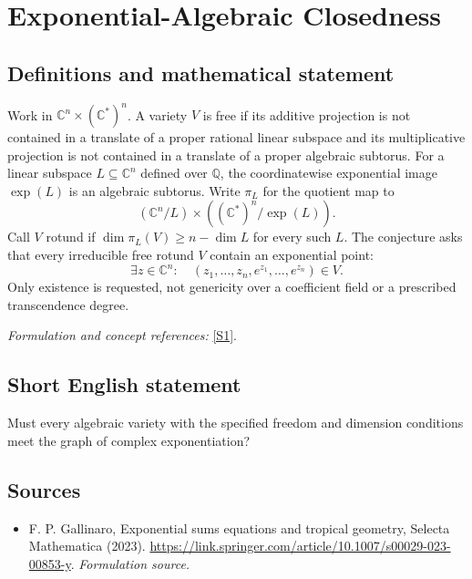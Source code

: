 \documentclass[11pt]{article}
\begin{document}
\section*{\texorpdfstring{Exponential-Algebraic Closedness}{Exponential-Algebraic Closedness}}\label{statement}
\subsection{Definitions and mathematical statement}
Work in ${\mathbb{C}}^n\times({\mathbb{C}}^*)^n$. A variety $V$ is free if its additive projection is not contained in a translate of a proper rational linear subspace and its multiplicative projection is not contained in a translate of a proper algebraic subtorus. For a linear subspace $L\subseteq{\mathbb{C}}^n$ defined over ${\mathbb{Q}}$, the coordinatewise exponential image $\exp(L)$ is an algebraic subtorus. Write $\pi_L$ for the quotient map to
\[
 ({\mathbb{C}}^n/L)\times(({\mathbb{C}}^*)^n/\exp(L)).
\]
Call $V$ rotund if $\dim\pi_L(V)\ge n-\dim L$ for every such $L$. The conjecture asks that every irreducible free rotund $V$ contain an exponential point:
\[
 \exists z\in{\mathbb{C}}^n:\quad (z_1,\ldots,z_n,e^{z_1},\ldots,e^{z_n})\in V.
\]
Only existence is requested, not genericity over a coefficient field or a prescribed transcendence degree.
\par\smallskip\textit{Formulation and concept references:} \href{https://link.springer.com/article/10.1007/s00029-023-00853-y}{[S1]}.

\subsection{Short English statement}
Must every algebraic variety with the specified freedom and dimension conditions meet the graph of complex exponentiation?
\subsection{Sources}
\begin{itemize}
\item[S1]F. P. Gallinaro, Exponential sums equations and tropical geometry, Selecta Mathematica (2023).
\url{https://link.springer.com/article/10.1007/s00029-023-00853-y}.
\textit{Formulation source.}
\end{itemize}
\end{document}
